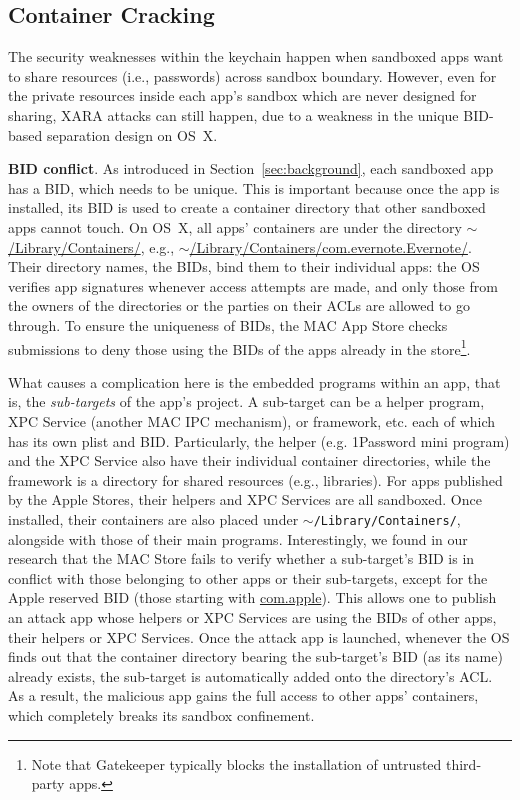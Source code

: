 \documentclass{article}
\begin{document}
\subsection{Container Cracking}
\label{subsec:bundleid}




The security weaknesses within the keychain happen when sandboxed apps want to share resources (i.e., passwords) across sandbox boundary. However, even for the private resources inside each app's sandbox which are never designed for sharing, XARA attacks can still happen, due to a weakness in the unique BID-based separation design on OS~X.

\vspace {3pt}\noindent\textbf{BID conflict}. As introduced in Section~\ref{sec:background}, each sandboxed app has a BID, which needs to be unique.  This is important because once the app is installed, its BID is used to create a container directory that other sandboxed apps cannot touch. On OS~X, all apps' containers are under the directory $\sim$\url{/Library/Containers/}, e.g., $\sim$\url{/Library/Containers/com.evernote.Evernote/}.  \\Their directory names, the BIDs, bind them to their individual apps: the OS verifies app signatures whenever access attempts are made, and only those from the owners of the directories or the parties on their ACLs are allowed to go through.  To ensure the uniqueness of BIDs, the MAC App Store checks submissions to deny those using the BIDs of the apps already in the store\footnote{\small Note that Gatekeeper typically blocks the installation of untrusted third-party apps.}.

What causes a complication here is the embedded programs within an app, that is, the \textit{sub-targets} of the app's project. A sub-target can be a helper program, XPC Service (another MAC IPC mechanism), or framework, etc. each of which has its own plist and BID. Particularly, the helper (e.g. 1Password mini program) and the XPC Service also have their individual container directories, while the framework is a directory for shared resources (e.g., libraries). For apps published by the Apple Stores, their helpers and XPC Services are all sandboxed. Once installed, their containers are also placed under \texttt{$\sim$/Library/Containers/}, alongside with those of their main programs. Interestingly, we found in our research that the MAC Store fails to verify whether a sub-target's BID is in conflict with those belonging to other apps or their sub-targets, except for the Apple reserved BID (those starting with \url{com.apple}). This allows one to publish an attack app whose helpers or XPC Services are using the BIDs of other apps, their helpers or XPC Services.  Once the attack app is launched, whenever the OS finds out that the container directory bearing the sub-target's BID (as its name) already exists, the sub-target is automatically added onto the directory's ACL.  As a result, the malicious app gains the full access to other apps' containers, which completely breaks its sandbox confinement.
\end{document}
